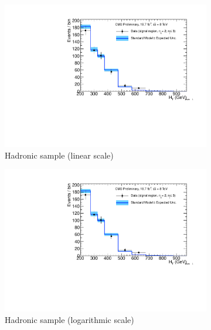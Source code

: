 \clearpage
\begin{figure}[h!]
  \centering
  \begin{subfigure}[b]{0.48\textwidth}
    \includegraphics[width=\textwidth,page=1]
    {Figs/results/v0/blueBand/bestFit_2012dev_RQcdZero_fZinvAll_2b_le3j-1h_smOnly}
    \caption{Hadronic sample (linear scale)}
  \end{subfigure}
  \begin{subfigure}[b]{0.48\textwidth}
    \includegraphics[width=\textwidth,page=2]
    {Figs/results/v0/blueBand/bestFit_2012dev_RQcdZero_fZinvAll_2b_le3j-1h_smOnly}
    \caption{Hadronic sample (logarithmic scale)}
  \end{subfigure}
  \begin{subfigure}[b]{0.48\textwidth}

\end{subfigure}
\end{figure}
